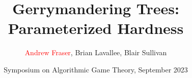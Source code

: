 \documentclass[table]{beamer}
\title{Gerrymandering Trees: Parameterized Hardness}
\author{\textcolor{red}{Andrew Fraser}, Brian Lavallee, Blair Sullivan}
\date{Symposium on Algorithmic Game Theory, September 2023}
\begin{document}
	\begin{frame}
		\titlepage
	\end{frame}

	
	
	
	
\end{document}
